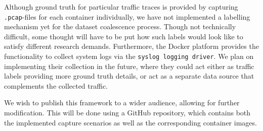 Although ground truth for particular traffic traces is provided by capturing \texttt{.pcap}-files for each container individually, we have not implemented a labelling mechanism yet for the dataset coalescence process. Though not technically difficult, some thought will have to be put how such labels would look like to satisfy different research demands.
Furthermore, the Docker platform provides the functionality to collect system logs via the \texttt{syslog logging driver}. We plan on implementing their collection in the future, where they could act either as traffic labels providing more ground truth details, or act as a separate data source that complements the collected traffic.

We wish to publish this framework to a wider audience, allowing for further modification. This will be done using a GitHub repository, which contains both the implemented capture scenarios as well as the corresponding container images.

